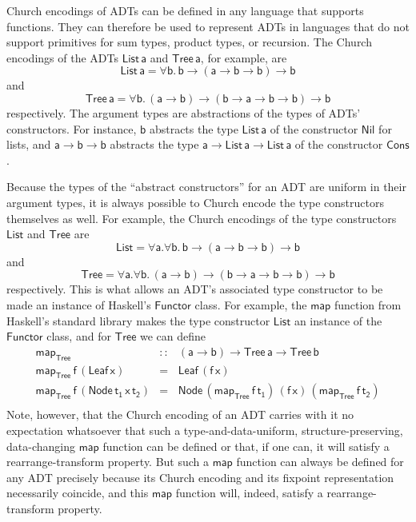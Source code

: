 \documentclass[submission,copyright,creativecommons]{eptcs}
\begin{document}
Church encodings of ADTs can be defined in any language that supports
functions. They can therefore be used to represent ADTs in languages
that do not support primitives for sum types, product types, or
recursion. The Church encodings of the ADTs $\mathsf{List\,a}$ and
$\mathsf{Tree\,a}$, for example, are
\[\mathsf{List\,a} = \mathsf{\forall b.\,b \to (a \to b \to b) \to b}\]
and 
\[\mathsf{Tree\,a} = \mathsf{\forall b.\,(a \to b) \to (b \to a \to b
  \to b) \to b}\] respectively. The argument types are abstractions of
the types of ADTs' constructors. For instance, $\mathsf{b}$ abstracts
the type $\mathsf{List\,a}$ of the constructor $\mathsf{Nil}$ for
lists, and $\mathsf{a \to b \to b}$ abstracts the type $\mathsf{a \to
  List\,a \to List\,a}$ of the constructor $\mathsf{Cons}$.

Because the types of the ``abstract constructors'' for an ADT are
uniform in their argument types, it is always possible to Church
encode the type constructors themselves as well. For example, the
Church encodings of the type constructors $\mathsf{List}$ and
$\mathsf{Tree}$ are
\[\mathsf{List} = \mathsf{\forall a. \forall b.\,b \to (a \to b \to b)
  \to b}\] 
and 
\[\mathsf{Tree} = \mathsf{\forall a. \forall b.\,(a \to b) \to (b \to
  a \to b \to b) \to b}\] respectively. This is what allows an ADT's
associated type constructor to be made an instance of Haskell's
$\mathsf{Functor}$ class. For example, the
$\mathsf{map}$ function
from Haskell's standard library
makes the type constructor $\mathsf{List}$ an
instance of the $\mathsf{Functor}$ class, and for $\mathsf{Tree}$ we
can define
\[\begin{array}{lll}
\mathsf{map_{Tree}} & \mathsf{::} & \mathsf{(a \to b) \to Tree\,a \to Tree \,b}\\
\mathsf{map_{Tree}\, f\, (Leaf\,x)} & \mathsf{=} & \mathsf{Leaf\,(f\,x)}\\
\mathsf{map_{Tree}\, f\, (Node\,t_1\,x\,t_2)} & \mathsf{=} &
\mathsf{Node\,(map_{Tree}\, f \,t_1)\,(f\,x)\,(map_{Tree}\,f\,t_2)}\\
\end{array}\]
Note, however, that the Church encoding of an ADT carries with it no
expectation whatsoever that such a type-and-data-uniform,
structure-preserving, data-changing $\mathsf{map}$ function can be
defined or that, if one can, it will satisfy a rearrange-transform
property. But such a $\mathsf{map}$ function can always be defined for
any ADT precisely because its Church encoding and its fixpoint
representation necessarily coincide, and this $\mathsf{map}$ function
will, indeed, satisfy a rearrange-transform property.
\end{document}
